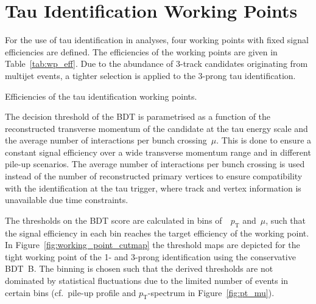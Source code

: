 \section{Tau Identification Working Points}
\label{sec:bdt_working_points}

For the use of tau identification in analyses, four working points with fixed
signal efficiencies are defined. The efficiencies of the working points are
given in Table~\ref{tab:wp_eff}. Due to the abundance of 3-track \tauhadvis
candidates originating from multijet events, a tighter selection is applied to
the 3-prong tau identification. 

\begin{table}[htb]
  \centering
  {\small}
  \caption{Efficiencies of the tau identification working points.}
  \label{tab:wp_eff}
\end{table}

The decision threshold of the BDT is parametrised as a function of the
reconstructed transverse momentum of the \tauhadvis candidate at the tau energy
scale and the average number of interactions per bunch crossing~$\mu$. This is
done to ensure a constant signal efficiency over a wide transverse momentum
range and in different pile-up scenarios. The average number of interactions per
bunch crossing is used instead of the number of reconstructed primary vertices
to ensure compatibility with the identification at the tau trigger, where track
and vertex information is unavailable due time constraints.

The thresholds on the BDT score are calculated in bins
of~\tauhadvis~$p_\text{T}$ and~$\mu$, such that the signal efficiency in each
bin reaches the target efficiency of the working point. In
Figure~\ref{fig:working_point_cutmap} the threshold maps are depicted for the
tight working point of the 1- and 3-prong identification using the conservative
\mbox{BDT B}. The binning is chosen such that the derived thresholds are not
dominated by statistical fluctuations due to the limited number of events in
certain bins (cf.\ pile-up profile and \tauhadvis $p_\text{T}$-spectrum in
Figure~\ref{fig:pt_mu}).

